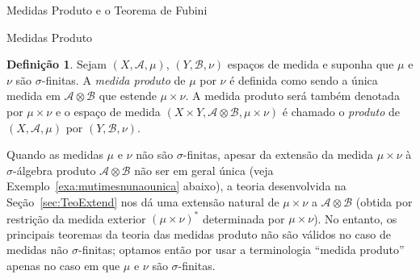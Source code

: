 \documentclass[oneside,final,11pt]{amsbook}
\theoremstyle{remark}\newtheorem{exercise}{Exercício}[chapter]
\theoremstyle{remark}\newtheorem{*exercise}[exercise]{\hbox to 0pt{\hskip 0pt minus 1fil*}Exercício}
\theoremstyle{definition}\newtheorem{exdefin}{Definição}[chapter]
\theoremstyle{plain}\newtheorem{teo}{Teorema}[section]
\theoremstyle{plain}\newtheorem{lem}[teo]{Lema}
\theoremstyle{plain}\newtheorem{prop}[teo]{Proposição}
\theoremstyle{plain}\newtheorem{cor}[teo]{Corolário}
\theoremstyle{definition}\newtheorem{defin}[teo]{Definição}
\theoremstyle{remark}\newtheorem{rem}[teo]{Observação}
\theoremstyle{definition}\newtheorem{notation}[teo]{Notação}
\theoremstyle{definition}\newtheorem{convention}[teo]{Convenção}
\theoremstyle{definition}\newtheorem{example}[teo]{Exemplo}
\numberwithin{section}{chapter}
\numberwithin{equation}{section}
\begin{document}
\begin{chapter}{Medidas Produto e o Teorema de Fubini}
\begin{section}{Medidas Produto}
\begin{defin}
Sejam $(X,\mathcal A,\mu)$, $(Y,\mathcal B,\nu)$ espaços de medida e suponha que
$\mu$ e $\nu$ são $\sigma$-finitas. A {\em medida produto\/}
de $\mu$ por $\nu$ é definida como sendo a única medida em $\mathcal A\otimes\mathcal B$ que estende
$\mu\times\nu$. A medida produto será também denotada por $\mu\times\nu$\index[simbolos]{$\mu\times\nu$}
e o espaço de medida $(X\times Y,\mathcal A\otimes\mathcal B,\mu\times\nu)$ é chamado
o {\em produto\/}%
 de $(X,\mathcal A,\mu)$ por $(Y,\mathcal B,\nu)$.
\end{defin}
Quando as medidas $\mu$ e $\nu$ não são $\sigma$-finitas, apesar da extensão da medida $\mu\times\nu$
à $\sigma$-álgebra produto $\mathcal A\otimes\mathcal B$ não ser em geral única (veja Exemplo~\ref{exa:mutimesnunaounica} abaixo),
a teoria desenvolvida na Seção~\ref{sec:TeoExtend} nos dá uma extensão natural de $\mu\times\nu$ a $\mathcal A\otimes\mathcal B$
(obtida por restrição da medida exterior $(\mu\times\nu)^*$ determinada por $\mu\times\nu$).
No entanto, os principais teoremas da teoria das medidas produto não são válidos no caso
de medidas não $\sigma$-finitas; optamos então por usar a terminologia ``medida produto'' apenas
no caso em que $\mu$ e $\nu$ são $\sigma$-finitas.


\end{section}
\end{chapter}
\end{document}
